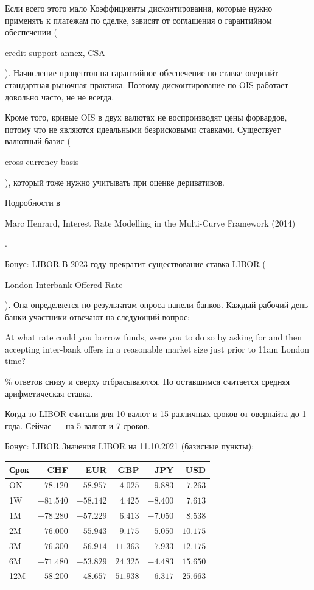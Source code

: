 \documentclass{beamer}
\newcommand{\en}[1]{\begin{otherlanguage}{english}#1\end{otherlanguage}}
\begin{document}
\begin{frame}{Если всего этого мало}
\justify
Коэффициенты дисконтирования, которые нужно применять к платежам по сделке, зависят от соглашения о гарантийном обеспечении (\en{credit support annex, CSA}). Начисление процентов на гарантийное обеспечение по ставке овернайт --- стандартная рыночная практика. Поэтому дисконтирование по OIS работает довольно часто, не не всегда.

\justify
Кроме того, кривые OIS в двух валютах не воспроизводят цены форвардов, потому что не являются идеальными безрисковыми ставками. Существует валютный базис (\en{cross-currency basis}), который тоже нужно учитывать при оценке деривативов.

\justify
Подробности в \en{Marc Henrard, Interest Rate Modelling in the Multi-Curve Framework (2014)}.
\end{frame}



\begin{frame}{Бонус: LIBOR}
\justify
В 2023 году прекратит существование ставка LIBOR (\en{London Interbank Offered Rate}). Она определяется по результатам опроса панели банков. Каждый рабочий день банки-участники отвечают на следующий вопрос:

\justify
\en{At what rate could you borrow funds, were you to do so by asking for and then accepting inter-bank offers in a reasonable market size just prior to 11am London time?}

\% ответов снизу и сверху отбрасываются. По оставшимся считается средняя арифметическая ставка.

\justify
Когда-то LIBOR считали для 10 валют и 15 различных сроков от овернайта до 1 года. Сейчас --- на 5 валют и 7 сроков.
\end{frame}



\begin{frame}{Бонус: LIBOR}
\justify
Значения LIBOR на 11.10.2021 (базисные пункты):
\justify
\centering
\begin{tabular}{l|r|r|r|r|r}
Срок & CHF       & EUR       & GBP      & JPY      & USD \\ \hline
ON   & $-78.120$ & $-58.957$ & $4.025$  & $-9.883$ & $7.263$ \\
1W   & $-81.540$ & $-58.142$ & $4.425$  & $-8.400$ & $7.613$ \\
1M   & $-78.280$ & $-57.229$ & $6.413$  & $-7.050$ & $8.538$ \\
2M   & $-76.000$ & $-55.943$ & $9.175$  & $-5.050$ & $10.175$ \\
3M   & $-76.300$ & $-56.914$ & $11.363$ & $-7.933$ & $12.175$ \\
6M   & $-71.480$ & $-53.829$ & $24.325$ & $-4.483$ & $15.650$ \\
12M  & $-58.200$ & $-48.657$ & $51.938$ & $6.317$  & $25.663$
\end{tabular}
\end{frame}
\end{document}
